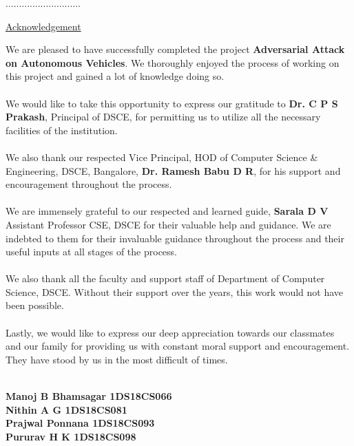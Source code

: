 \documentclass[ 12pt,a4paper,twocolumn,fleqn]{article}
\begin{document}
\hfill{............................} \\
\newpage
   \pagestyle{fancy}
   \thispagestyle{empty}
\thisfancypage{%
  \setlength{\fboxsep}{20pt}\doublebox}{}
\begin{center}
\LARGE{{\underline{Acknowledgement}}} \\
\end{center}
\normalsize
We are pleased to have successfully completed the project \textbf{Adversarial Attack on Autonomous Vehicles}. We thoroughly enjoyed the process of working on this project and gained a lot of knowledge doing so.
\\
\hfill
\\
We would like to take this opportunity to express our gratitude to \textbf{Dr. C P S Prakash}, Principal of DSCE, for permitting us to utilize all the necessary facilities of the institution.
\\
\hfill
\\
We also thank our respected Vice Principal, HOD of Computer Science \& Engineering, DSCE, Bangalore,\textbf{ Dr. Ramesh Babu D R}, for his support and encouragement throughout the process.
\\
\hfill
\\
We are immensely grateful to our respected and learned guide, \textbf{Sarala D V} Assistant Professor CSE, DSCE for their valuable help and guidance. We are indebted to them for their invaluable guidance throughout the process and their useful inputs at all stages of the process.
\\
\hfill
\\
We also thank all the faculty and support staff of Department of Computer Science, DSCE. Without their support over the years, this work would not have been possible.
\\
\hfill
\\
Lastly, we would like to express our deep appreciation towards our classmates and our family for providing us with constant moral support and encouragement. They have stood by us in the most difficult of times.
\\
\hfill
\\
\begin{flushright}
\textbf{Manoj B Bhamsagar \space 1DS18CS066} \\
\textbf{Nithin A G \space 1DS18CS081} \\
\textbf{Prajwal Ponnana \space 1DS18CS093} \\
\textbf{Pururav H K \space 1DS18CS098} \\
\end{flushright}
\end{document}
